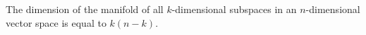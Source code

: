 The dimension of the manifold of all $k$-dimensional subspaces in an $n$-dimensional vector space is equal to $k(n - k)$.
